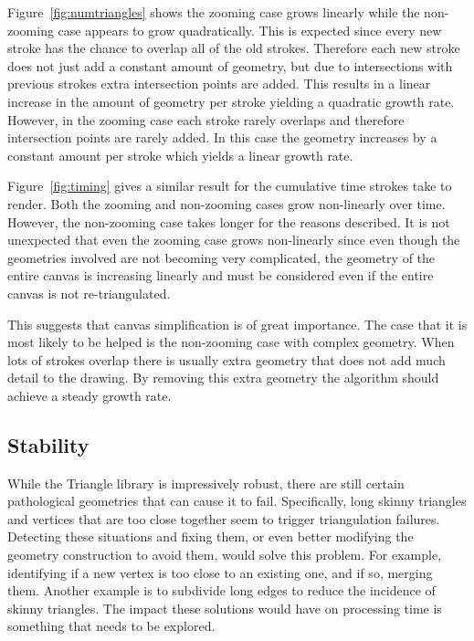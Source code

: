 \documentclass[review]{acmsiggraph}
\begin{document}
Figure~\ref{fig:numtriangles} shows the zooming case grows linearly while the non-zooming case
appears to grow quadratically. This is expected since every new stroke has the chance to overlap
all of the old strokes. Therefore each new stroke does not just add a constant amount of geometry, but 
due to intersections with previous strokes extra intersection points are added. This results in a linear
increase in the amount of geometry per stroke yielding a quadratic growth rate. However, in the zooming case each stroke rarely overlaps and therefore
intersection points are rarely added. In this case the geometry increases by a constant amount per stroke which yields
a linear growth rate.

Figure~\ref{fig:timing} gives a similar result for the cumulative time strokes take to render. Both
the zooming and non-zooming cases grow non-linearly over time. However, the non-zooming case takes
longer for the reasons described. It is not unexpected that even the zooming case grows non-linearly
since even though the geometries involved are not becoming very complicated, the geometry of the entire
canvas is increasing linearly and must be considered even if the entire canvas is not re-triangulated.

This suggests that canvas simplification is of great importance.
The case that it is most likely to be helped is the non-zooming case with complex geometry. When lots of strokes
overlap there is usually extra geometry that does not add much detail to the drawing. By removing
this extra geometry the algorithm should achieve a steady growth rate.

\subsection{Stability}
While the Triangle library is impressively robust, there are still certain pathological geometries that can cause it to fail.  Specifically, long skinny triangles and vertices that are too close together seem to trigger triangulation failures.  Detecting these situations and fixing them, or even better modifying the geometry construction to avoid them, would solve this problem.  For example, identifying if a new vertex is too close to an existing one, and if so, merging them.  Another example is to subdivide long edges to reduce the incidence of skinny triangles.  The impact these solutions would have on processing time is something that needs to be explored.
\end{document}
